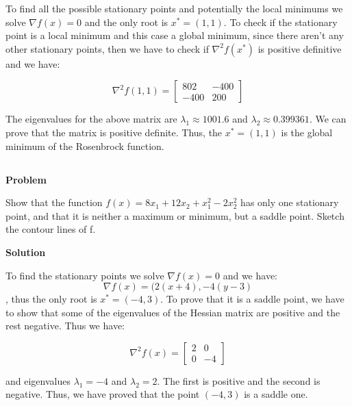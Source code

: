 \documentclass[a4paper,11pt]{article}
\numberwithin{equation}{section} %
\begin{document}
To find all the possible stationary points and potentially the local minimums we solve $\nabla f(x) =0$ and the only root is $x^{*} = (1,1)$. To check if the stationary point is a local minimum and this case a global minimum, since there aren't any other stationary points, then we have to check if $\nabla^2 f(x^{*})$ is positive definitive and we have:

\begin{equation}
    \nabla^2 f(1,1) =
    \begin{bmatrix}
        802 & -400 \\
        -400 & 200
    \end{bmatrix}
\end{equation}

The eigenvalues for the above matrix are $\lambda_1 \approx 1001.6$ and $\lambda_2 \approx 0.399361$. We can prove that the matrix is positive definite. Thus, the $x^{*} = (1,1)$ is the global minimum of the Rosenbrock function.

\subsection{}

\textbf{Problem}

Show that the function $f(x) = 8x_1 + 12x_2 + x_1^2 - 2x_2^2$ has only one stationary
point, and that it is neither a maximum or minimum, but a saddle point. Sketch the contour
lines of f.

\textbf{Solution}


To find the stationary points we solve $\nabla f(x) = 0$ and we have:
\begin{equation}
    \nabla f(x) = (2(x+4), -4(y-3)
\end{equation}
, thus the only root is $x^{*} = (-4, 3)$. To prove that it is a saddle point, we have to show that some of the eigenvalues of the Hessian matrix are positive and the rest negative. Thus we have:

\begin{equation}
    \nabla^2 f(x) =
    \begin{bmatrix}
        2 & 0 \\
        0 & -4
    \end{bmatrix}
\end{equation}

and eigenvalues $\lambda_1 = -4$ and $\lambda_2 = 2$. The first is positive and the second is negative. Thus, we have proved that the point $(-4, 3)$ is a saddle one.
\end{document}
